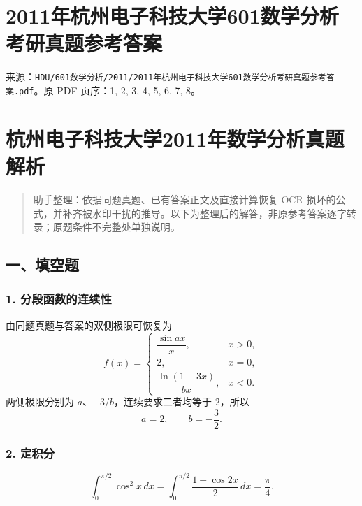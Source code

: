 \documentclass[11pt,fontset=fandol]{ctexart}
\begin{document}
\section{2011年杭州电子科技大学601数学分析考研真题参考答案}\label{ux5e74ux676dux5ddeux7535ux5b50ux79d1ux6280ux5927ux5b66601ux6570ux5b66ux5206ux6790ux8003ux7814ux771fux9898ux53c2ux8003ux7b54ux6848}

来源：\texttt{HDU/601数学分析/2011/2011年杭州电子科技大学601数学分析考研真题参考答案.pdf}。原
PDF 页序：1, 2, 3, 4, 5, 6, 7, 8。

\section{杭州电子科技大学2011年数学分析真题解析}\label{ux676dux5ddeux7535ux5b50ux79d1ux6280ux5927ux5b662011ux5e74ux6570ux5b66ux5206ux6790ux771fux9898ux89e3ux6790}

\begin{quote}
助手整理：依据同题真题、已有答案正文及直接计算恢复 OCR
损坏的公式，并补齐被水印干扰的推导。以下为整理后的解答，非原参考答案逐字转录；原题条件不完整处单独说明。
\end{quote}

\subsection{一、填空题}\label{ux4e00ux586bux7a7aux9898}

\subsubsection{1.
分段函数的连续性}\label{ux5206ux6bb5ux51fdux6570ux7684ux8fdeux7eedux6027}

由同题真题与答案的双侧极限可恢复为 \[
f(x)=\begin{cases}\dfrac{\sin ax}{x},&x>0,\\2,&x=0,\\\dfrac{\ln(1-3x)}{bx},&x<0.\end{cases}
\] 两侧极限分别为 \(a\)、\(-3/b\)，连续要求二者均等于 2，所以 \[
\boxed{a=2,\qquad b=-\frac32.}
\]

\subsubsection{2. 定积分}\label{ux5b9aux79efux5206}

\[
\boxed{\int_0^{\pi/2}\cos^2x\,dx
=\int_0^{\pi/2}\frac{1+\cos2x}{2}\,dx=\frac\pi4.}
\]
\end{document}
